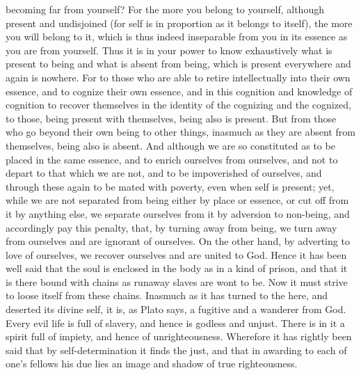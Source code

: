 \documentclass{article}
\begin{document}
becoming far from yourself? For the more you belong to yourself, although present and undisjoined (for self is in proportion as it belongs to itself), the more you will belong to it, which is thus indeed inseparable from you in its essence as you are from yourself. Thus it is in your power to know exhaustively what is present to being and what is absent from being, which is present everywhere and again is nowhere. For to those who are able to retire intellectually into their own essence, and to cognize their own essence, and in this cognition and knowledge of cognition to recover themselves in the identity of the cognizing and the cognized, to those, being present with themselves, being also is present. But from those who go beyond their own being to other things, inasmuch as they are absent from themselves, being also is absent. And although we are so constituted as to be placed in the same essence, and to enrich ourselves from ourselves, and not to depart to that which we are not, and to be impoverished of ourselves, and through these again to be mated with poverty, even when self is present; yet, while we are not separated from being either by place or essence, or cut off from it by anything else, we separate ourselves from it by adversion to non-being, and accordingly pay this penalty, that, by turning away from being, we turn away from ourselves and are ignorant of ourselves. On the other hand, by adverting to love of ourselves, we recover ourselves and are united to God. Hence it has been well said that the soul is enclosed in the body as in a kind of prison, and that it is there bound with chains as runaway slaves are wont to be. Now it must strive to loose itself from these chains. Inasmuch as it has turned to the here, and deserted its divine self, it is, as Plato says, a fugitive and a wanderer from God. Every evil life is full of slavery, and hence is godless and unjust. There is in it a spirit full of impiety, and hence of unrighteousness. Wherefore it has rightly been said that by self-determination it finds the just, and that in awarding to each of one's fellows his due lies an image and shadow of true righteousness.
\end{document}

